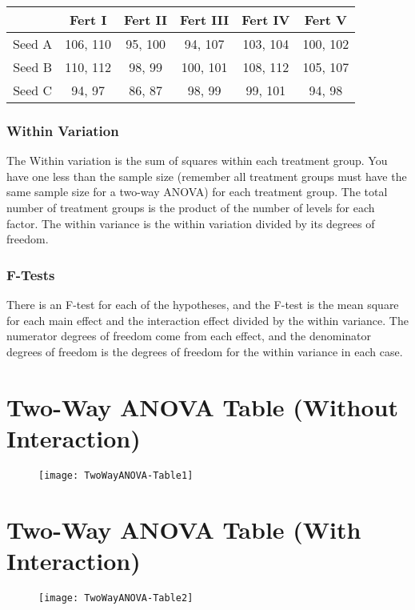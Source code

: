 \documentclass[12pt]{article}
\begin{document}
	\begin{center}
		\begin{tabular}{|c||c|c|c|c|c|}
			\hline 
			&	Fert I	&	Fert II	&	Fert III	&	Fert IV	&	Fert V	\\	\hline
			Seed A	&	106, 110	&	95, 100	&	94, 107	&	103, 104	&	100, 102	\\	\hline
			Seed B	&	110, 112	&	98, 99	&	100, 101	&	108, 112	&	105, 107	\\	\hline
			Seed C	&	94, 97	&	86, 87	&	98, 99	&	99, 101	&	94, 98	\\	\hline
		\end{tabular} 
	\end{center}

		
	\subsubsection*{Within Variation}
	
	The Within variation is the sum of squares within each treatment group. You have one less than the sample size (remember all treatment groups must have the same sample size for a two-way ANOVA) for each treatment group. The total number of treatment groups is the product of the number of levels for each factor. The within variance is the within variation divided by its degrees of freedom.
	
	
	\subsubsection*{F-Tests}
	
	There is an F-test for each of the hypotheses, and the F-test is the mean square for each main effect and the interaction effect divided by the within variance. The numerator degrees of freedom come from each effect, and the denominator degrees of freedom is the degrees of freedom for the within variance in each case.

	
	

	\newpage
\section*{Two-Way ANOVA Table (Without Interaction)}
\begin{figure}[h!]
\centering
\texttt{[image: TwoWayANOVA-Table1]}
\end{figure}
	\newpage
	\section*{Two-Way ANOVA Table (With Interaction)}
\begin{figure}[h!]
\centering
\texttt{[image: TwoWayANOVA-Table2]}
\end{figure}
	\newpage
\end{document}
